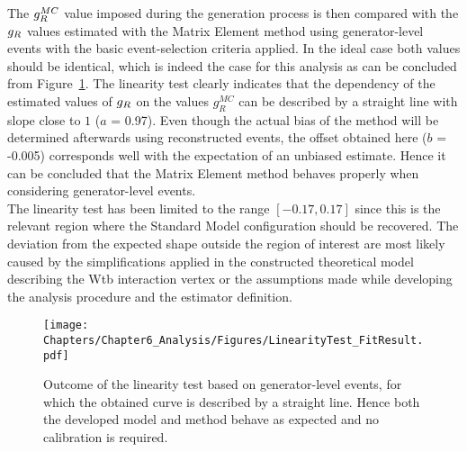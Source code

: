 The $g_{R}^{MC}$ value imposed during the generation process is then compared with the $g_{R}$ values estimated with the Matrix Element method using generator-level events with the basic event-selection criteria applied.
In the ideal case both values should be identical, which is indeed the case for this analysis as can be concluded from Figure~\ref{fig::CalibCurve}.
The linearity test clearly indicates that the dependency of the estimated values of $g_{R}$ on the values $g_{R}^{MC}$ can be described by a straight line with slope close to $1$ ($a$ = 0.97).
Even though the actual bias of the method will be determined afterwards using reconstructed events, the offset obtained here ($b$ = -0.005) corresponds well with the expectation of an unbiased estimate.
Hence it can be concluded that the Matrix Element method behaves properly when considering generator-level events.
\\
The linearity test has been limited to the range $\left[-0.17, 0.17\right]$ since this is the relevant region where the Standard Model configuration should be recovered. 
The deviation from the expected shape outside the region of interest are most likely caused by the simplifications applied in the constructed theoretical model describing the Wtb interaction vertex or the assumptions made while developing the analysis procedure and the estimator definition. 
\begin{figure}[h!t]
 \centering
 \texttt{[image: Chapters/Chapter6\_Analysis/Figures/LinearityTest\_FitResult.pdf]}
 \caption{Outcome of the linearity test based on generator-level events, for which the obtained curve is described by a straight line. Hence both the developed model and method behave as expected and no calibration is required.} \label{fig::CalibCurve}
\end{figure}
%


